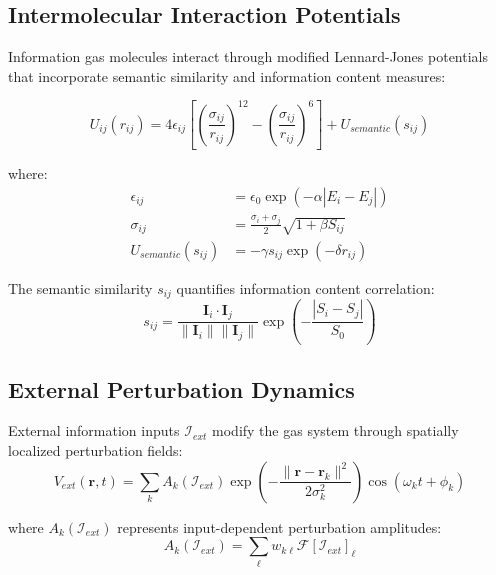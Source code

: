 \documentclass[11pt,a4paper]{article}
\begin{document}
\subsection{Intermolecular Interaction Potentials}

Information gas molecules interact through modified Lennard-Jones potentials that incorporate semantic similarity and information content measures:

\begin{equation}
U_{ij}(r_{ij}) = 4\epsilon_{ij}\left[\left(\frac{\sigma_{ij}}{r_{ij}}\right)^{12} - \left(\frac{\sigma_{ij}}{r_{ij}}\right)^6\right] + U_{semantic}(s_{ij})
\label{eq:interaction-potential}
\end{equation}

where:
\begin{align}
\epsilon_{ij} &= \epsilon_0 \exp(-\alpha |E_i - E_j|) \label{eq:epsilon-modulation} \\
\sigma_{ij} &= \frac{\sigma_i + \sigma_j}{2} \sqrt{1 + \beta S_{ij}} \label{eq:sigma-modulation} \\
U_{semantic}(s_{ij}) &= -\gamma s_{ij} \exp(-\delta r_{ij})
\end{align}

The semantic similarity $s_{ij}$ quantifies information content correlation:
\begin{equation}
s_{ij} = \frac{\mathbf{I}_i \cdot \mathbf{I}_j}{\|\mathbf{I}_i\| \|\mathbf{I}_j\|} \exp\left(-\frac{|S_i - S_j|}{S_0}\right)
\label{eq:semantic-similarity}
\end{equation}

\subsection{External Perturbation Dynamics}

External information inputs $\mathcal{I}_{ext}$ modify the gas system through spatially localized perturbation fields:
\begin{equation}
V_{ext}(\mathbf{r}, t) = \sum_{k} A_k(\mathcal{I}_{ext}) \exp\left(-\frac{\|\mathbf{r} - \mathbf{r}_k\|^2}{2\sigma_k^2}\right) \cos(\omega_k t + \phi_k)
\label{eq:external-perturbation}
\end{equation}

where $A_k(\mathcal{I}_{ext})$ represents input-dependent perturbation amplitudes:
\begin{equation}
A_k(\mathcal{I}_{ext}) = \sum_{\ell} w_{k\ell} \mathcal{F}[\mathcal{I}_{ext}]_\ell
\label{eq:perturbation-amplitude}
\end{equation}
\end{document}
